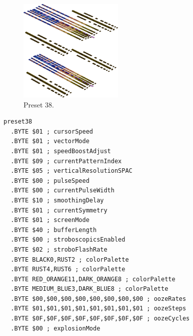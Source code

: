 \vspace*{-0.5cm}
\begin{minipage}[b]{0.48\linewidth}
\begin{figure}[H]                                                          
  \centering                                                             
  \begin{adjustbox}{width=5cm,center}                                   
  \includegraphics[width=5cm]{src/colorspace_presets/preset38-45.png}%
  \end{adjustbox}                                                        
\caption*{Preset 38.}                                           
\end{figure}                                                               
\end{minipage}
\hspace{0.1cm}
\begin{minipage}[b]{0.48\linewidth}                                                                         
\begin{lstlisting}[basicstyle=\ttfamily\tiny]
preset38
  .BYTE $01 ; cursorSpeed
  .BYTE $01 ; vectorMode
  .BYTE $01 ; speedBoostAdjust
  .BYTE $09 ; currentPatternIndex
  .BYTE $05 ; verticalResolutionSPAC
  .BYTE $00 ; pulseSpeed
  .BYTE $00 ; currentPulseWidth
  .BYTE $10 ; smoothingDelay
  .BYTE $01 ; currentSymmetry
  .BYTE $01 ; screenMode
  .BYTE $40 ; bufferLength
  .BYTE $00 ; stroboscopicsEnabled
  .BYTE $02 ; stroboFlashRate
  .BYTE BLACK0,RUST2 ; colorPalette
  .BYTE RUST4,RUST6 ; colorPalette
  .BYTE RED_ORANGE11,DARK_ORANGE8 ; colorPalette
  .BYTE MEDIUM_BLUE3,DARK_BLUE8 ; colorPalette
  .BYTE $00,$00,$00,$00,$00,$00,$00,$00 ; oozeRates
  .BYTE $01,$01,$01,$01,$01,$01,$01,$01 ; oozeSteps
  .BYTE $0F,$0F,$0F,$0F,$0F,$0F,$0F,$0F ; oozeCycles
  .BYTE $00 ; explosionMode
\end{lstlisting}
\end{minipage}


